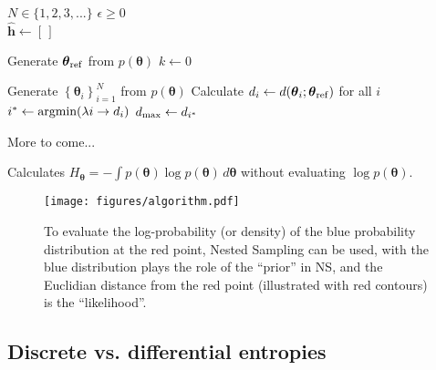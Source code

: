 \documentclass[entropy,article,accept,oneauthor,pdftex,10pt,a4paper]{mdpi}
\newcommand{\x}{\boldsymbol{\theta}}
\begin{document}
\begin{algorithm}
\begin{algorithmic}
\State $N \in \{1, 2, 3, ... \}$
\State $\epsilon \geq 0$
             \\
\hrulefill
\State $\widehat{\mathbf{h}} \leftarrow [\,]$

    \State Generate $\x_{\rm ref}$ from $p(\x)$
    \State $k \leftarrow 0$
  {\color{green}
    \State Generate $\left\{\x_i\right\}_{i=1}^N$ from $p(\x)$
    \State Calculate $d_i \leftarrow d(\x_i; \x_{\rm ref})$ for all $i$
    \State $i^* \leftarrow \textnormal{argmin}(\lambda i \rightarrow d_i)$
    \State $d_{\rm max} \leftarrow d_{i^*}$

  } %
\State More to come...
\EndWhile
\end{algorithmic}
\caption{Calculates $H_{\x} = -\int p(\x) \log p(\x) \, d\x$
         without evaluating $\log p(\x)$.}
\end{algorithm}

\begin{figure}[!ht]
\centering
\texttt{[image: figures/algorithm.pdf]}
\caption{To evaluate the log-probability (or density) of the blue
probability distribution at the red point, Nested Sampling can be used,
with the blue distribution plays the role of the ``prior'' in NS, and the
Euclidian distance from the red point (illustrated with red contours)
is the ``likelihood''.\label{fig:algorithm}}
\end{figure}


\subsection{Discrete vs. differential entropies}
\end{document}
